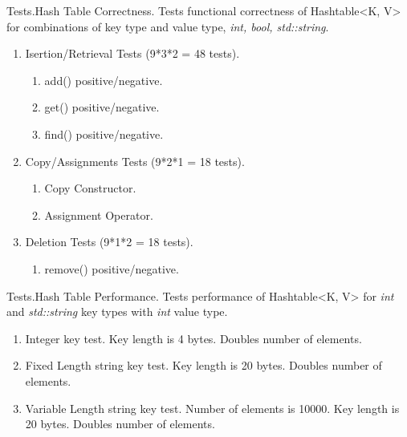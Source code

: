 \documentclass{beamer}
\begin{document}
\begin{frame}{Tests.}{Hash Table Correctness.}
  Tests functional correctness of Hashtable<K, V> for combinations of
  key type and value type, \textit{int, bool, std::string}. 
  \begin{enumerate}
    \item Isertion/Retrieval Tests (9*3*2 = 48 tests).   
      \begin{enumerate}
      \item add() positive/negative.
      \item get() positive/negative.
      \item find() positive/negative.
      \end{enumerate}
    \item Copy/Assignments Tests (9*2*1 = 18 tests). 
      \begin{enumerate}
      \item Copy Constructor.
      \item Assignment Operator.
      \end{enumerate}
    \item  Deletion Tests (9*1*2 = 18 tests).
      \begin{enumerate}
        \item remove() positive/negative. 
      \end{enumerate}
  \end{enumerate}
\end{frame}

\begin{frame}{Tests.}{Hash Table Performance.}
  Tests performance of Hashtable<K, V> for \textit{int} and \textit{std::string}
  key types with \textit{int} value type.
  \begin{enumerate}
    \item Integer key test. Key length is 4 bytes. Doubles number of elements.
    \item Fixed Length string key test. Key length is 20 bytes. Doubles number of elements. 
    \item Variable Length string key test. Number of elements is 10000. Key length is 20 bytes. Doubles number of elements. 
  \end{enumerate}
\end{frame}
\end{document}

